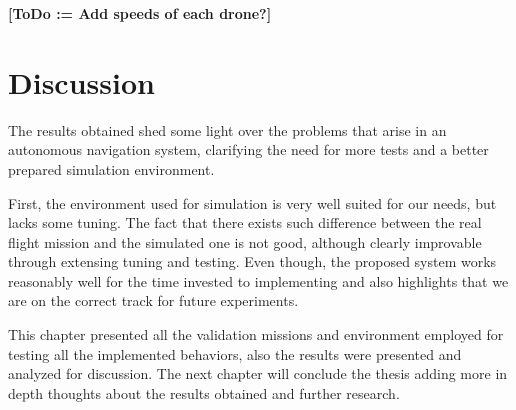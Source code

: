   \textbf{[ToDo := Add speeds of each drone?]}

\section{Discussion} \label{ch_5:sect:discussion}

  The results obtained shed some light over the problems that arise in an autonomous navigation system, clarifying the need for more tests and a better prepared simulation environment.

  First, the environment used for simulation is very well suited for our needs, but lacks some tuning. The fact that there exists such difference between  the real flight mission and the simulated one is not good, although clearly improvable through extensing tuning and testing. Even though, the proposed system works reasonably well for the time invested to implementing and also highlights that we are on the correct track for future experiments.

This chapter presented all the validation missions and environment employed for testing all the implemented behaviors, also the results were presented and analyzed for discussion. The next chapter will conclude the thesis adding more in depth thoughts about the results obtained and further research.
